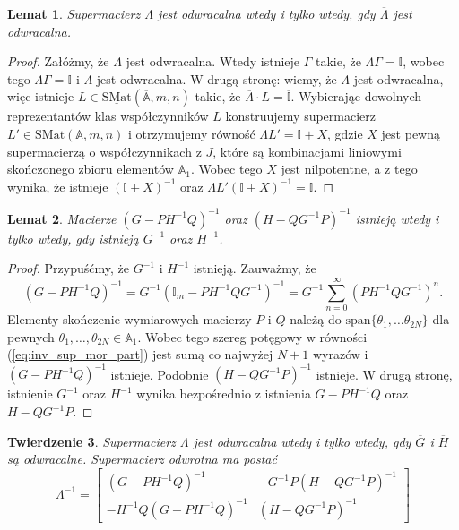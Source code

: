 \documentclass[11pt,a4paper]{report}
\newtheorem{theorem}{Twierdzenie}[section]
\newtheorem{lemma}[theorem]{Lemat}
\theoremstyle{definition}
\newcommand{\I}{\mathbb{I}}
\begin{document}
  \begin{lemma}
  \label{lem:sinvert01}
   Supermacierz $\Lambda$ jest odwracalna wtedy i tylko wtedy, gdy $\overline{\Lambda}$ jest odwracalna.
  \end{lemma}
  \begin{proof}
  Załóżmy, że $\Lambda$ jest odwracalna. Wtedy istnieje $\Gamma$ takie, że $\Lambda \Gamma = \mathbb{I}$, wobec tego $\overline{\Lambda} \overline{\Gamma} = \overline{\mathbb{I}}$ i $\overline{\Lambda}$ jest odwracalna. W drugą stronę: wiemy, że $\overline{\Lambda}$ jest odwracalna, więc istnieje $L \in \underline{\mathrm{SMat}}(\overline{\mathbb{A}},m,n)$ takie, że $\overline{\Lambda} \cdot L = \overline{\mathbb{I}}$. Wybierając dowolnych reprezentantów klas współczynników $L$ konstruujemy supermacierz $L' \in \underline{\mathrm{SMat}}(\mathbb{A},m,n)$ i otrzymujemy równość $\Lambda L' = \mathbb{I} + X$, gdzie $X$ jest pewną supermacierzą o współczynnikach z $J$, które są kombinacjami liniowymi skończonego zbioru elementów $\mathbb{A}_1$. Wobec tego $X$ jest nilpotentne, a z tego wynika, że istnieje $(\mathbb{I}+X)^{-1}$ oraz $\Lambda L' (\mathbb{I}+X)^{-1} = \mathbb{I}$.
  \end{proof}
  
  \begin{lemma}
  \label{lem:sinvert02}
   Macierze $(G-PH^{-1}Q)^{-1}$ oraz $(H-QG^{-1}P)^{-1}$ istnieją wtedy i tylko wtedy, gdy istnieją $G^{-1}$ oraz $H^{-1}$.
  \end{lemma}
  
  \begin{proof}
   Przypuśćmy, że $G^{-1}$ i $H^{-1}$ istnieją. Zauważmy, że 
   \begin{equation}
   \label{eq:inv_sup_mor_part}
    (G-PH^{-1}Q)^{-1} = G^{-1}(\I_m - PH^{-1}QG^{-1})^{-1}=G^{-1} \sum_{n=0}^{\infty} (PH^{-1}QG^{-1})^{n}.
   \end{equation}
   Elementy skończenie wymiarowych macierzy $P$ i $Q$ należą do $\mathrm{span} \{ \theta_1, \ldots \theta_{2N} \}$ dla pewnych $\theta_1, \ldots, \theta_{2N} \in \mathbb{A}_1$. Wobec tego szereg potęgowy w równości (\ref{eq:inv_sup_mor_part}) jest sumą co najwyżej $N+1$ wyrazów i $(G-PH^{-1}Q)^{-1}$ istnieje. Podobnie $(H-QG^{-1}P)^{-1}$ istnieje. W drugą stronę, istnienie $G^{-1}$ oraz $H^{-1}$ wynika bezpośrednio z istnienia $G-PH^{-1}Q$ oraz $H-QG^{-1}P$.
  \end{proof}

\begin{theorem}
\label{thm:supermatrix_invertibility}
 Supermacierz $\Lambda$ jest odwracalna wtedy i tylko wtedy, gdy $\overline{G}$ i $\overline{H}$ są odwracalne. Supermacierz odwrotna ma postać
     \begin{equation}
     \Lambda^{-1} = \begin{bmatrix}
      (G-PH^{-1}Q)^{-1}			& 	-G^{-1}P(H-QG^{-1}P)^{-1} \\
      -H^{-1}Q(G-PH^{-1}Q)^{-1} 	& 	(H-QG^{-1}P)^{-1}
     \end{bmatrix}
     \end{equation}
\end{theorem}
  
\end{document}
